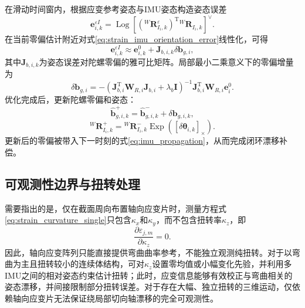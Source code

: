 在滑动时间窗内，根据应变参考姿态与IMU姿态构造姿态误差
\begin{equation}
    \bm e_{i,k}^{\varepsilon I}
    =\operatorname{Log}\left[
    \left({}^{W}\bm R_{I_i,k}^{\varepsilon}\right)^{\mathrm T}
    {}^{W}\bm R_{I_i,k}
    \right]^{\vee}.
    \label{eq:strain_imu_orientation_error}
\end{equation}
在当前零偏估计附近对式\eqref{eq:strain_imu_orientation_error}线性化，可得
\begin{equation}
    \bm e_{i,k}^{\varepsilon I}
    \approx \bm e_{i,k}^{0}
    +\bm J_{b,i,k}\delta\bm b_{g,i},
\end{equation}
其中$\bm J_{b,i,k}$为姿态误差对陀螺零偏的雅可比矩阵。局部最小二乘意义下的零偏增量为
\begin{equation}
    \delta\bm b_{g,i}
    =-\left(
    \bm J_{b,i}^{\mathrm T}\bm W_{R,i}\bm J_{b,i}
    +\lambda_b\bm I
    \right)^{-1}
    \bm J_{b,i}^{\mathrm T}\bm W_{R,i}\bm e_{i}^{0}.
    \label{eq:bias_local_update}
\end{equation}
优化完成后，更新陀螺零偏和姿态：
\begin{equation}
    \hat{\bm b}_{g,i,k}^{+}
    =\hat{\bm b}_{g,i,k}^{-}+\delta\bm b_{g,i,k},
\end{equation}
\begin{equation}
    {}^{W}\bm R_{I_i,k}^{+}
    ={}^{W}\bm R_{I_i,k}^{-}
    \operatorname{Exp}
    \left([\delta\bm\theta_{i,k}]_{\times}\right).
\end{equation}
更新后的零偏被带入下一时刻的式\eqref{eq:imu_propagation}，从而完成闭环漂移补偿。

\subsection{可观测性边界与扭转处理}
\label{subsec:observability}

需要指出的是，仅在截面周向布置轴向应变片时，测量方程式\eqref{eq:strain_curvature_single}只包含$\kappa_x$和$\kappa_y$，而不包含扭转率$\kappa_z$，即
\begin{equation}
    \frac{\partial\varepsilon_{j,m}}{\partial\kappa_z}=0.
    \label{eq:torsion_unobservable}
\end{equation}
因此，轴向应变阵列只能直接提供弯曲曲率参考，不能独立观测纯扭转。对于以弯曲为主且扭转较小的连续体结构，可对$\kappa_z$设置零均值或小幅变化先验，并利用多IMU之间的相对姿态约束估计扭转；此时，应变信息能够有效校正与弯曲相关的姿态漂移，并间接限制部分扭转误差。对于存在大幅、独立扭转的三维运动，仅依赖轴向应变片无法保证绕局部切向轴漂移的完全可观测性。

